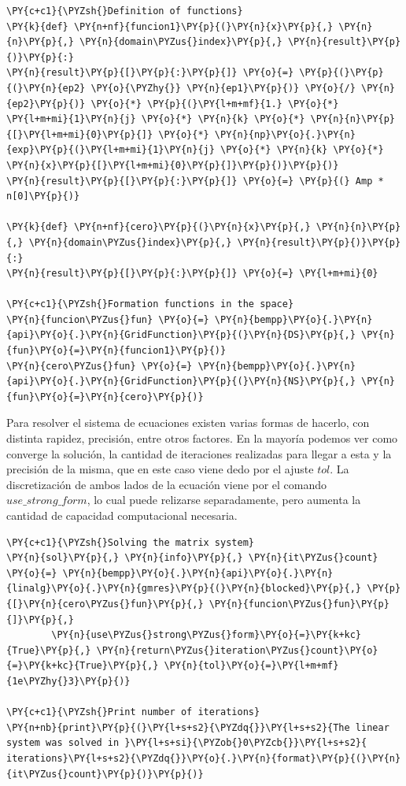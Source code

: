 \begin{tcolorbox}
\begin{Verbatim}[commandchars=\\\{\}]
\PY{c+c1}{\PYZsh{}Definition of functions}
\PY{k}{def} \PY{n+nf}{funcion1}\PY{p}{(}\PY{n}{x}\PY{p}{,} \PY{n}{n}\PY{p}{,} \PY{n}{domain\PYZus{}index}\PY{p}{,} \PY{n}{result}\PY{p}{)}\PY{p}{:}
\PY{n}{result}\PY{p}{[}\PY{p}{:}\PY{p}{]} \PY{o}{=} \PY{p}{(}\PY{p}{(}\PY{n}{ep2} \PY{o}{\PYZhy{}} \PY{n}{ep1}\PY{p}{)} \PY{o}{/} \PY{n}{ep2}\PY{p}{)} \PY{o}{*} \PY{p}{(}\PY{l+m+mf}{1.} \PY{o}{*} \PY{l+m+mi}{1}\PY{n}{j} \PY{o}{*} \PY{n}{k} \PY{o}{*} \PY{n}{n}\PY{p}{[}\PY{l+m+mi}{0}\PY{p}{]} \PY{o}{*} \PY{n}{np}\PY{o}{.}\PY{n}{exp}\PY{p}{(}\PY{l+m+mi}{1}\PY{n}{j} \PY{o}{*} \PY{n}{k} \PY{o}{*} \PY{n}{x}\PY{p}{[}\PY{l+m+mi}{0}\PY{p}{]}\PY{p}{)}\PY{p}{)}
\PY{n}{result}\PY{p}{[}\PY{p}{:}\PY{p}{]} \PY{o}{=} \PY{p}{(} Amp * n[0]\PY{p}{)}
        
\PY{k}{def} \PY{n+nf}{cero}\PY{p}{(}\PY{n}{x}\PY{p}{,} \PY{n}{n}\PY{p}{,} \PY{n}{domain\PYZus{}index}\PY{p}{,} \PY{n}{result}\PY{p}{)}\PY{p}{:}
\PY{n}{result}\PY{p}{[}\PY{p}{:}\PY{p}{]} \PY{o}{=} \PY{l+m+mi}{0}

\PY{c+c1}{\PYZsh{}Formation functions in the space}            
\PY{n}{funcion\PYZus{}fun} \PY{o}{=} \PY{n}{bempp}\PY{o}{.}\PY{n}{api}\PY{o}{.}\PY{n}{GridFunction}\PY{p}{(}\PY{n}{DS}\PY{p}{,} \PY{n}{fun}\PY{o}{=}\PY{n}{funcion1}\PY{p}{)}        
\PY{n}{cero\PYZus{}fun} \PY{o}{=} \PY{n}{bempp}\PY{o}{.}\PY{n}{api}\PY{o}{.}\PY{n}{GridFunction}\PY{p}{(}\PY{n}{NS}\PY{p}{,} \PY{n}{fun}\PY{o}{=}\PY{n}{cero}\PY{p}{)}
\end{Verbatim}
\end{tcolorbox}
Para resolver el sistema de ecuaciones existen varias formas de hacerlo, con distinta rapidez, precisión, entre otros factores. En la mayoría podemos ver como converge la solución, la cantidad de iteraciones realizadas para llegar a esta y la precisión de la misma, que en este caso viene dedo por el ajuste $tol$. La discretización de ambos lados de la ecuación viene por el comando $use\_strong\_form$, lo cual puede relizarse separadamente, pero aumenta la cantidad de capacidad computacional necesaria.
\begin{tcolorbox}
\begin{Verbatim}[commandchars=\\\{\}]
\PY{c+c1}{\PYZsh{}Solving the matrix system}
\PY{n}{sol}\PY{p}{,} \PY{n}{info}\PY{p}{,} \PY{n}{it\PYZus{}count} \PY{o}{=} \PY{n}{bempp}\PY{o}{.}\PY{n}{api}\PY{o}{.}\PY{n}{linalg}\PY{o}{.}\PY{n}{gmres}\PY{p}{(}\PY{n}{blocked}\PY{p}{,} \PY{p}{[}\PY{n}{cero\PYZus{}fun}\PY{p}{,} \PY{n}{funcion\PYZus{}fun}\PY{p}{]}\PY{p}{,}
		\PY{n}{use\PYZus{}strong\PYZus{}form}\PY{o}{=}\PY{k+kc}{True}\PY{p}{,} \PY{n}{return\PYZus{}iteration\PYZus{}count}\PY{o}{=}\PY{k+kc}{True}\PY{p}{,} \PY{n}{tol}\PY{o}{=}\PY{l+m+mf}{1e\PYZhy{}3}\PY{p}{)}

\PY{c+c1}{\PYZsh{}Print number of iterations}         
\PY{n+nb}{print}\PY{p}{(}\PY{l+s+s2}{\PYZdq{}}\PY{l+s+s2}{The linear system was solved in }\PY{l+s+si}{\PYZob{}0\PYZcb{}}\PY{l+s+s2}{ iterations}\PY{l+s+s2}{\PYZdq{}}\PY{o}{.}\PY{n}{format}\PY{p}{(}\PY{n}{it\PYZus{}count}\PY{p}{)}\PY{p}{)}
\end{Verbatim}
\end{tcolorbox}
